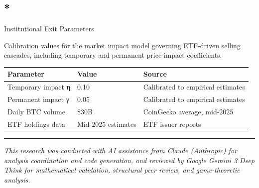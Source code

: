 \documentclass[
  11pt,
]{article}
\let\oldsubsection\subsection
\renewcommand{\subsection}[1]{\FloatBarrier\oldsubsection{#1}}
\begin{document}
\hypertarget{institutional-exit-parameters}{%
\subsection*{Institutional Exit
Parameters}\label{institutional-exit-parameters}}

Calibration values for the market impact model governing ETF-driven
selling cascades, including temporary and permanent price impact
coefficients.

\begin{longtable}[]{@{}lll@{}}
\toprule\noalign{}
Parameter & Value & Source \\
\midrule\noalign{}
\endhead
\bottomrule\noalign{}
\endlastfoot
Temporary impact η & 0.10 & Calibrated to empirical estimates \\
Permanent impact γ & 0.05 & Calibrated to empirical estimates \\
Daily BTC volume & \$30B & CoinGecko average, mid-2025 \\
ETF holdings data & Mid-2025 estimates & ETF issuer reports \\
\end{longtable}

\begin{center}\rule{0.5\linewidth}{0.5pt}\end{center}

\emph{This research was conducted with AI assistance from Claude
(Anthropic) for analysis coordination and code generation, and reviewed
by Google Gemini 3 Deep Think for mathematical validation, structural
peer review, and game-theoretic analysis.}
\end{document}
